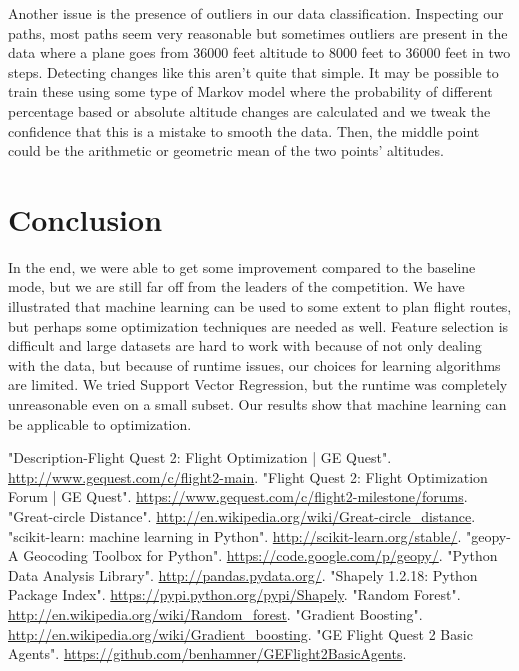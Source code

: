 \documentclass{article}[12pt]
\begin{document}
\begin{multicols}{2}
Another issue is the presence of outliers in our data classification. Inspecting our paths, most paths seem very reasonable but sometimes outliers are present in the data where a plane goes from 36000 feet altitude to 8000 feet to 36000 feet in two steps. Detecting changes like this aren't quite that simple. It may be possible to train these using some type of Markov model where the probability of different percentage based or absolute altitude changes are calculated and we tweak the confidence that this is a mistake to smooth the data. Then, the middle point could be the arithmetic or geometric mean of the two points' altitudes.

\section{Conclusion}
In the end, we were able to get some improvement compared to the baseline mode, but we are still far off from the leaders of the competition. We have illustrated that machine learning can be used to some extent to plan flight routes, but perhaps some optimization techniques are needed as well. Feature selection is difficult and large datasets are hard to work with because of not only dealing with the data, but because of runtime issues, our choices for learning algorithms are limited. We tried Support Vector Regression, but the runtime was completely unreasonable even on a small subset. Our results show that machine learning can be applicable to optimization.


\begin{thebibliography}{1}

 "Description-Flight Quest 2: Flight Optimization | GE Quest". \url{http://www.gequest.com/c/flight2-main}.
 "Flight Quest 2: Flight Optimization Forum | GE Quest". \url{https://www.gequest.com/c/flight2-milestone/forums}.
 "Great-circle Distance". \url{http://en.wikipedia.org/wiki/Great-circle_distance}.
 "scikit-learn: machine learning in Python". \url{http://scikit-learn.org/stable/}.
 "geopy-A Geocoding Toolbox for Python". \url{https://code.google.com/p/geopy/}.
 "Python Data Analysis Library". \url{http://pandas.pydata.org/}.
 "Shapely 1.2.18: Python Package Index". \url{https://pypi.python.org/pypi/Shapely}.
 "Random Forest". \url{http://en.wikipedia.org/wiki/Random_forest}.
 "Gradient Boosting". \url{http://en.wikipedia.org/wiki/Gradient_boosting}.
 "GE Flight Quest 2 Basic Agents". \url{https://github.com/benhamner/GEFlight2BasicAgents}.
\end{thebibliography}
\end{multicols}
\end{document}

